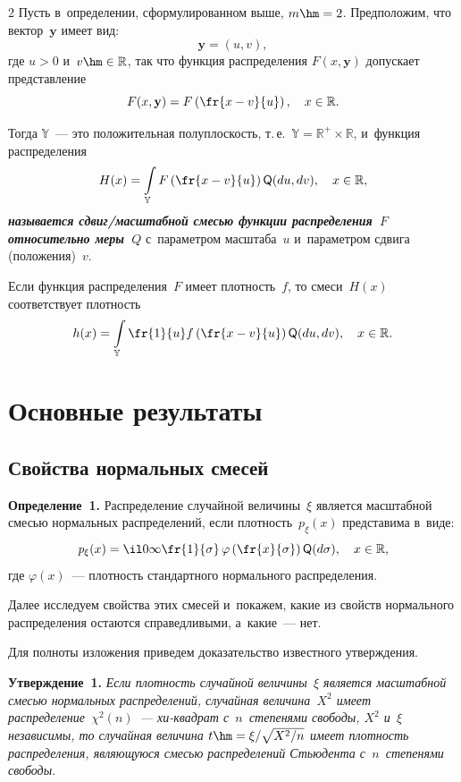 \begin{multicols}{2}
Пусть в~определении, сформулированном выше, $m \hm= 2$. Предположим, что вектор~$\mathbf{y}$ имеет вид:
$$
\mathbf{y} = (u, v),
$$
где $u > 0$ и~$v \hm\in \mathbb{R}$, так что функция распределения $F (x,\textbf{y})$ 
допускает представление
$$
        F (x,\textbf{y}) = F \left(\fr{x-v}{u}\right), \quad  x \in \mathbb{R}.
$$

Тогда $\mathbb{Y}$~--- это положительная полуплоскость, т.\,е.\ $\mathbb{Y = R^+ \times R}$, 
и~функция распределения
$$
        H(x) = \int\limits_ \mathbb{Y} F\left(\fr{x-v}{u}\right) {\sf Q} (du, dv), \quad  x \in \mathbb{R},
$$
{\bfseries\textit{называется сдвиг/масштабной смесью функции распределения~$F$ относительно меры~$Q$}} 
с~параметром масштаба~$u$ и~параметром сдвига (положения)~$v$.

Если функция распределения~$F$ имеет плотность~$f$, то смеси~$H(x)$ соответствует плотность
$$
        h(x) = \int\limits_ \mathbb{Y} \fr{1}{u} f\left(\fr{x-v}{u}\right) {\sf Q} (du, dv), \quad  x \in \mathbb{R}.
$$

\vspace*{-12pt}


\section{Основные результаты}

\subsection{Свойства нормальных смесей}

\noindent
\textbf{Определение~1.}
Распределение случайной величины~$\xi$ является масштабной смесью нормальных 
распределений, если плотность~$\mathit{p}_\xi(x)$ представима в~виде:
$$
\mathit{p}_\xi(x) = \il 0 \infty \fr{1}{\sigma} \, \varphi\left(\fr{x}{\sigma}\right) {\sf Q} (d\sigma), 
\quad x \in \mathbb{R},
$$
где $\varphi(x)$~--- плотность стандартного нормального распределения.

\smallskip

Далее исследуем свойства этих смесей и~покажем, какие из свойств 
нормального распределения остаются справедливыми, а~какие~--- нет.


Для полноты изложения приведем доказательство известного утверждения.

\smallskip

\noindent
\textbf{Утверждение~1.}
\textit{Если плотность случайной величины~$\xi$ является масштабной смесью нормальных распределений, 
случайная величина~$X^2$ имеет распределение~$\chi^2(n)$~--- хи-квад\-рат с~$n$~степенями свободы, 
$X^2$ и~$\xi$ независимы, то случайная величина $t \hm= {\xi}/{\sqrt{X^2/n}}$ 
имеет плотность распределения, являющуюся смесью распределений Стьюдента с~$n$~степенями свободы}.



\end{multicols}
